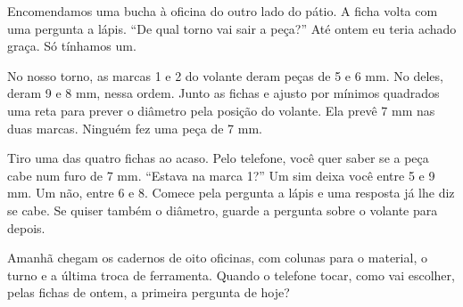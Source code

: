 Encomendamos uma bucha à oficina do outro lado do pátio. A ficha volta com uma pergunta a lápis. “De qual torno vai sair a peça?” Até ontem eu teria achado graça. Só tínhamos um.

No nosso torno, as marcas 1 e 2 do volante deram peças de 5 e 6 mm. No deles, deram 9 e 8 mm, nessa ordem. Junto as fichas e ajusto por mínimos quadrados uma reta para prever o diâmetro pela posição do volante. Ela prevê 7 mm nas duas marcas. Ninguém fez uma peça de 7 mm.

Tiro uma das quatro fichas ao acaso. Pelo telefone, você quer saber se a peça cabe num furo de 7 mm. “Estava na marca 1?” Um sim deixa você entre 5 e 9 mm. Um não, entre 6 e 8. Comece pela pergunta a lápis e uma resposta já lhe diz se cabe. Se quiser também o diâmetro, guarde a pergunta sobre o volante para depois.

Amanhã chegam os cadernos de oito oficinas, com colunas para o material, o turno e a última troca de ferramenta. Quando o telefone tocar, como vai escolher, pelas fichas de ontem, a primeira pergunta de hoje?
